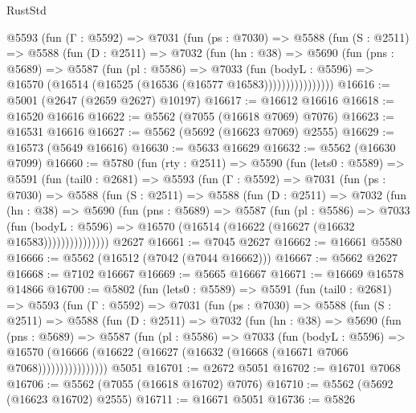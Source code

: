 \begin{lexlean}{RustStd}
\begin{coremodule}
          @5593
            (fun (Γ : @5592) =>
            @7031
              (fun (ps : @7030) =>
              @5588
                (fun (S : @2511) =>
                @5588
                  (fun (D : @2511) =>
                  @7032
                    (fun (hn : @38) =>
                    @5690
                      (fun (pns : @5689) =>
                      @5587
                        (fun (pl : @5586) =>
                        @7033
                          (fun (bodyL : @5596) =>
                          @16570 (@16514 (@16525 (@16536 (@16577 @16583))))))))))))))))
@16616 := @5001 (@2647 (@2659 @2627) @10197)
@16617 := @16612 @16616
@16618 := @16520 @16616
@16622 := @5562 (@7055 (@16618 @7069) @7076)
@16623 := @16531 @16616
@16627 := @5562 (@5692 (@16623 @7069) @2555)
@16629 := @16573 (@5649 @16616)
@16630 := @5633 @16629
@16632 := @5562 (@16630 @7099)
@16660 := @5780
    (fun (rty : @2511) =>
    @5590
      (fun (lets0 : @5589) =>
      @5591
        (fun (tail0 : @2681) =>
        @5593
          (fun (Γ : @5592) =>
          @7031
            (fun (ps : @7030) =>
            @5588
              (fun (S : @2511) =>
              @5588
                (fun (D : @2511) =>
                @7032
                  (fun (hn : @38) =>
                  @5690
                    (fun (pns : @5689) =>
                    @5587
                      (fun (pl : @5586) =>
                      @7033
                        (fun (bodyL : @5596) =>
                        @16570 (@16514 (@16622 (@16627 (@16632 @16583)))))))))))))))
    @2627
@16661 := @7045 @2627
@16662 := @16661 @5580
@16666 := @5562 (@16512 (@7042 (@7044 @16662)))
@16667 := @5662 @2627
@16668 := @7102 @16667
@16669 := @5665 @16667
@16671 := @16669 @16578 @14866
@16700 := @5802
    (fun (lets0 : @5589) =>
    @5591
      (fun (tail0 : @2681) =>
      @5593
        (fun (Γ : @5592) =>
        @7031
          (fun (ps : @7030) =>
          @5588
            (fun (S : @2511) =>
            @5588
              (fun (D : @2511) =>
              @7032
                (fun (hn : @38) =>
                @5690
                  (fun (pns : @5689) =>
                  @5587
                    (fun (pl : @5586) =>
                    @7033
                      (fun (bodyL : @5596) =>
                      @16570
                        (@16666 (@16622 (@16627 (@16632 (@16668 (@16671 @7066 @7068))))))))))))))))
    @5051
@16701 := @2672 @5051
@16702 := @16701 @7068
@16706 := @5562 (@7055 (@16618 @16702) @7076)
@16710 := @5562 (@5692 (@16623 @16702) @2555)
@16711 := @16671 @5051
@16736 := @5826

\end{coremodule}
\end{lexlean}
